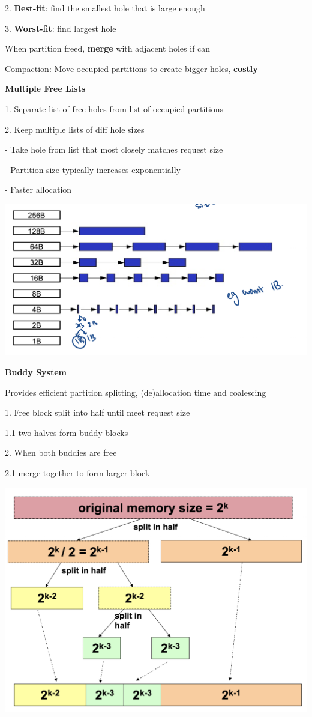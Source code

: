 \documentclass[10pt, a4paper]{article}
\newcommand{\highlight}[1]{{\color{red}\textbf{#1}}}
\newcommand{\red}[1]{{\color{red}#1}}
\newcommand{\green}[1]{{\color{ForestGreen}#1}}
\newcommand{\tab}[0]{\hspace*{2mm}}
\begin{document}
\begin{multicols*}{3}
		2. \textbf{Best-fit}: find the smallest hole that is large enough

		3. \textbf{Worst-fit}: find largest hole

		When partition freed, \highlight{merge} with adjacent holes if can

		Compaction: \red{Move occupied partitions} to create \green{bigger holes}, \highlight{costly}

		\textbf{Multiple Free Lists}

		1. Separate list of free holes from list of occupied partitions

		2. Keep multiple lists of diff hole sizes

		- Take hole from list that most closely matches request size

		- Partition size typically increases exponentially

		- Faster allocation

		\includegraphics*[scale=0.3]{./assets/multipleFreeList.png}

		\textbf{Buddy System}

		Provides efficient partition splitting, (de)allocation time and coalescing

		1. Free block split into half until meet request size

		\tab{} 1.1 two halves form buddy blocks

		2. When both buddies are free

		\tab{} 2.1 merge together to form larger block

		\includegraphics*[scale=.25]{./assets/buddy}


\end{multicols*}
\end{document}
